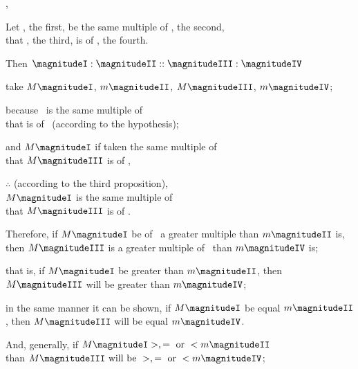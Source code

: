 \documentclass[booklanguage=english]{byrnebook}
\begin{document}
,\label{prop:V.C} %

\begin{center}
Let , the first, be the same multiple of , the second, \\
that , the third, is of , the fourth.

Then $\magnitudeI : \magnitudeII :: \magnitudeIII : \magnitudeIV$

take $M \magnitudeI$, $m \magnitudeII$, $M \magnitudeIII$, $m \magnitudeIV$;

because \magnitudeI\ is the same multiple of \magnitudeII \\
that \magnitudeIII is of \magnitudeIV\ (according to the hypothesis);

and $M \magnitudeI$ if taken the same multiple of \magnitudeI \\
that $M \magnitudeIII$ is of \magnitudeIII,

$\therefore$ (according to the third proposition),\\
$M \magnitudeI$ is the same multiple of \magnitudeII \\
that $M \magnitudeIII$ is of \magnitudeIV.

Therefore, if $M \magnitudeI$ be of \magnitudeII\ a greater multiple than $m \magnitudeII$ is, \\
then $M \magnitudeIII$ is a greater multiple of \magnitudeIV\ than $m \magnitudeIV$ is;

that is, if $M \magnitudeI$ be greater than $m \magnitudeII$, then $M \magnitudeIII$ will be greater than $m \magnitudeIV$;

in the same manner it can be shown, if $M \magnitudeI$ be equal $m \magnitudeII$, then $M \magnitudeIII$ will be equal $m \magnitudeIV$.

And, generally, if $M \magnitudeI >, = \mbox{ or } < m \magnitudeII$\\
than $M \magnitudeIII \mbox{ will be } >, = \mbox{ or } < m \magnitudeIV$;


\end{center}
\end{document}
